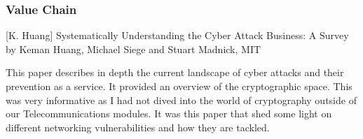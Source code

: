 \subsubsection{Value Chain}
[K. Huang] Systematically Understanding the Cyber Attack Business: A Survey by Keman Huang, Michael Siege and Stuart Madnick, MIT 

This paper describes in depth the current landscape of cyber attacks and their prevention as a service. It provided an overview of the cryptographic space. This was very informative as I had not dived into the world of cryptography outside of our Telecommunications modules. It was this paper that shed some light on different networking vulnerabilities and how they are tackled.

